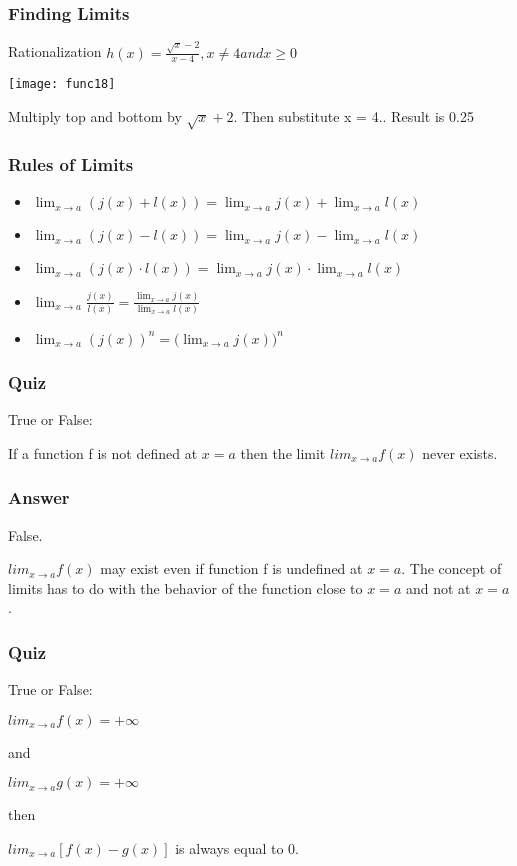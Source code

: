  \begin{frame}[fragile]\frametitle{Finding Limits}
Rationalization
$h(x) = \frac{\sqrt x - 2}{x - 4}, x \neq 4 and x \geq 0$
\begin{center}
\texttt{[image: func18]}
\end{center}
Multiply top and bottom by $\sqrt x + 2$. Then substitute x = 4.. Result is 0.25
\end{frame}


 \begin{frame}[fragile]\frametitle{Rules of Limits}
\begin{itemize}
\item $\lim_{x \to a} (j(x) + l(x)) = \lim_{x \to a} j(x) + \lim_{x \to a} l(x)$
\item $\lim_{x \to a} (j(x) - l(x)) = \lim_{x \to a} j(x) - \lim_{x \to a} l(x)$
\item $\lim_{x \to a} (j(x) \cdot l(x)) = \lim_{x \to a} j(x) \cdot \lim_{x \to a} l(x)$
\item $\lim_{x \to a} \frac{j(x)}{l(x)} = \frac{\lim_{x \to a} j(x)}{\lim_{x \to a} l(x)}$
\item $\lim_{x \to a} (j(x))^{n} = \Big(\lim_{x \to a} j(x)\Big)^{n}$
\end{itemize}

\end{frame}

 \begin{frame}[fragile]\frametitle{Quiz}
 True or False: 
 
If a function f is not defined at $x = a$ then the limit
$lim_{x \to a} f(x)$ never exists.

\end{frame}

 \begin{frame}[fragile]\frametitle{Answer}
False. 

$lim_{x \to a} f(x)$ may exist even if function f is undefined at $x = a$. The concept of limits has to do with the behavior of the function close to $x = a$ and not at $x = a$.

\end{frame}

 \begin{frame}[fragile]\frametitle{Quiz}
 True or False: 
 
$lim_{x\to a} f(x)  = + \infty$

and

$lim_{x\to a} g(x)  = + \infty$

then 

$lim_{x \to a} [ f(x) - g(x) ]$	is always equal to 0.

\end{frame}

